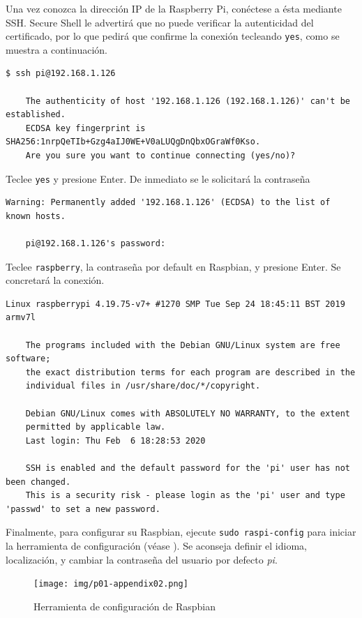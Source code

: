 \documentclass[letterpaper,10.5pt]{article}
\begin{document}
Una vez conozca la dirección IP de la Raspberry Pi, conéctese a ésta mediante SSH. %
Secure Shell le advertirá que no puede verificar la autenticidad del certificado, por lo que pedirá que confirme la conexión tecleando \texttt{yes}, como se muestra a continuación.

\begin{Verbatim}[fontsize=\footnotesize]
$ ssh pi@192.168.1.126

    The authenticity of host '192.168.1.126 (192.168.1.126)' can't be established.
    ECDSA key fingerprint is SHA256:1nrpQeTIb+Gzg4aIJ0WE+V0aLUQgDnQbxOGraWf0Kso.
    Are you sure you want to continue connecting (yes/no)?
\end{Verbatim}

Teclee \texttt{yes} y presione Enter.
De inmediato se le solicitará la contraseña

\begin{Verbatim}[fontsize=\footnotesize]
    Warning: Permanently added '192.168.1.126' (ECDSA) to the list of known hosts.

    pi@192.168.1.126's password:
\end{Verbatim}

Teclee \texttt{raspberry}, la contraseña por default en Raspbian, y presione Enter.
Se concretará la conexión.

\begin{Verbatim}[fontsize=\footnotesize]
    Linux raspberrypi 4.19.75-v7+ #1270 SMP Tue Sep 24 18:45:11 BST 2019 armv7l

    The programs included with the Debian GNU/Linux system are free software;
    the exact distribution terms for each program are described in the
    individual files in /usr/share/doc/*/copyright.

    Debian GNU/Linux comes with ABSOLUTELY NO WARRANTY, to the extent
    permitted by applicable law.
    Last login: Thu Feb  6 18:28:53 2020

    SSH is enabled and the default password for the 'pi' user has not been changed.
    This is a security risk - please login as the 'pi' user and type 'passwd' to set a new password.
\end{Verbatim}

Finalmente, para configurar su Raspbian, ejecute \texttt{sudo raspi-config}  para iniciar la herramienta de configuración (véase ).
Se aconseja definir el idioma, localización, y cambiar la contraseña del usuario por defecto \textit{pi}.

\begin{figure}[H]
	\centering%
	\texttt{[image: img/p01-appendix02.png]} %
	\caption{Herramienta de configuración de Raspbian}
	\label{fig:raspberry-config-tool} %
\end{figure}
\end{document}
